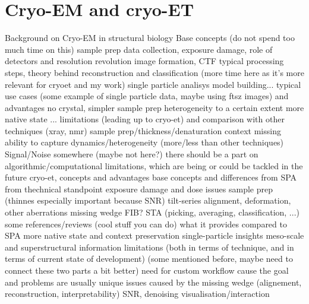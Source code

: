\chapter{Cryo-EM and cryo-ET}

\begin{outline}
\1 Background on Cryo-EM in structural biology
    \2 Base concepts (do not spend too much time on this)
        \3 sample prep
        \3 data collection, exposure damage, role of detectors and resolution revolution \cite{faruqiCCDDetectorsHighresolution2000}
        \3 image formation, CTF
        \3 typical processing steps, theory behind reconstruction and classification (more time here as it's more relevant for cryoet and my work)
        \3 single particle analisys
        \3 model building...
    \2 typical use cases (some example of single particle data, maybe using ftsz images) and advantages
        \3 no crystal, simpler sample prep
        \3 heterogeneity to a certain extent
        \3 more native state
        \3 ...
    \2 limitations (leading up to cryo-et) and comparison with other techniques (xray, nmr)
        \3 sample prep/thickness/denaturation
        \3 context missing
        \3 ability to capture dynamics/heterogeneity (more/less than other techniques)
        \3 Signal/Noise
        \3 somewhere (maybe not here?) there should be a part on algorithmic/computational limitations, which are being or could be tackled in the future
\1 cryo-et, concepts and advantages
    \2 base concepts and differences from SPA from thechnical standpoint
        \3 exposure damage and dose issues
        \3 sample prep (thinnes especially important because SNR)
        \3 tilt-series alignment, deformation, other aberrations
        \3 missing wedge
        \3 FIB?
        \3 STA (picking, averaging, classification, ...)
    \2 some references/reviews (cool stuff you can do)
        \3 \cite{turkPromiseChallengesCryoelectron2020,lucicCryoelectronTomographyChallenge2013}
    \2 what it provides compared to SPA
        \3 more native state and context preservation
        \3 single-particle insights
        \3 meso-scale and superstructural information
    \2 limitations (both in terms of technique, and in terms of current state of development)
        \3 (some mentioned before, maybe need to connect these two parts a bit better)
        \3 need for custom workflow cause the goal and problems are usually unique
        \3 issues caused by the missing wedge (alignement, reconstruction, interpretability)
        \3 SNR, denoising
        \3 visualisation/interaction
\end{outline}
